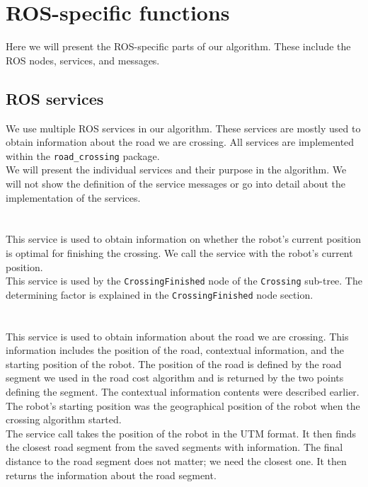 \section{ROS-specific functions}
    Here we will present the ROS-specific parts of our algorithm. These include the ROS nodes, services, and messages.

    \subsection{ROS services}
        We use multiple ROS services in our algorithm. These services are mostly used to obtain information about the road we are crossing. All services are implemented within the \texttt{road\_crossing} package.\\
        We will present the individual services and their purpose in the algorithm. We will not show the definition of the service messages or go into detail about the implementation of the services.\\\\
        \\
            This service is used to obtain information on whether the robot's current position is optimal for finishing the crossing. We call the service with the robot's current position.\\
            This service is used by the \texttt{CrossingFinished} node of the \texttt{Crossing} sub-tree. The determining factor is explained in the \texttt{CrossingFinished} node section.\\\\
        \\
            This service is used to obtain information about the road we are crossing. This information includes the position of the road, contextual information, and the starting position of the robot. The position of the road is defined by the road segment we used in the road cost algorithm and is returned by the two points defining the segment. The contextual information contents were described earlier. The robot's starting position was the geographical position of the robot when the crossing algorithm started.\\
            The service call takes the position of the robot in the UTM format. It then finds the closest road segment from the saved segments with information. The final distance to the road segment does not matter; we need the closest one. It then returns the information about the road segment.\\\\
